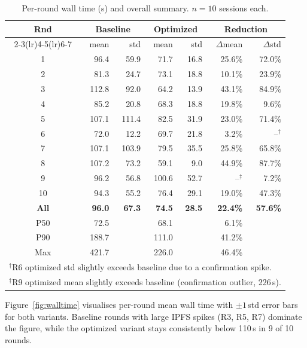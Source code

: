 \documentclass{llncs}
\begin{document}
\begin{table}[t]
\caption{Per-round wall time (s) and overall summary. $n=10$ sessions each.}
\label{tab:walltime}
\centering\footnotesize
\setlength{\tabcolsep}{4pt}
\begin{tabular}{c rr rr rr}
\toprule
\multirow{2}{*}{\textbf{Rnd}}
  & \multicolumn{2}{c}{\textbf{Baseline}}
  & \multicolumn{2}{c}{\textbf{Optimized}}
  & \multicolumn{2}{c}{\textbf{Reduction}} \\
\cmidrule(lr){2-3}\cmidrule(lr){4-5}\cmidrule(lr){6-7}
& mean & std & mean & std & $\Delta$mean & $\Delta$std \\
\midrule
 1 & 96.4  & 59.9  & 71.7  & 16.8  & 25.6\% & 72.0\% \\
 2 & 81.3  & 24.7  & 73.1  & 18.8  & 10.1\% & 23.9\% \\
 3 & 112.8 & 92.0  & 64.2  & 13.9  & 43.1\% & 84.9\% \\
 4 & 85.2  & 20.8  & 68.3  & 18.8  & 19.8\% & 9.6\%  \\
 5 & 107.1 & 111.4 & 82.5  & 31.9  & 23.0\% & 71.4\% \\
 6 & 72.0  & 12.2  & 69.7  & 21.8  &  3.2\% & --$^{\dagger}$ \\
 7 & 107.1 & 103.9 & 79.5  & 35.5  & 25.8\% & 65.8\% \\
 8 & 107.2 & 73.2  & 59.1  &  9.0  & 44.9\% & 87.7\% \\
 9 & 96.2  & 56.8  & 100.6 & 52.7  & --$^{\ddagger}$ & 7.2\% \\
10 & 94.3  & 55.2  & 76.4  & 29.1  & 19.0\% & 47.3\% \\
\midrule
\textbf{All} & \textbf{96.0} & \textbf{67.3} & \textbf{74.5} & \textbf{28.5}
  & \textbf{22.4\%} & \textbf{57.6\%} \\
P50 & 72.5 & & 68.1 && 6.1\% & \\
P90 & 188.7 & & 111.0 && 41.2\% & \\
Max & 421.7 & & 226.0 && 46.4\% & \\
\bottomrule
\multicolumn{7}{l}{$^{\dagger}$R6 optimized std slightly exceeds baseline due to a confirmation spike.} \\
\multicolumn{7}{l}{$^{\ddagger}$R9 optimized mean slightly exceeds baseline (confirmation outlier, 226\,s).}
\end{tabular}
\end{table}

Figure~\ref{fig:walltime} visualises per-round mean wall time with
$\pm1$\,std error bars for both variants. Baseline rounds with large
IPFS spikes (R3, R5, R7) dominate the figure, while the optimized
variant stays consistently below 110\,s in 9 of 10 rounds.
\end{document}
